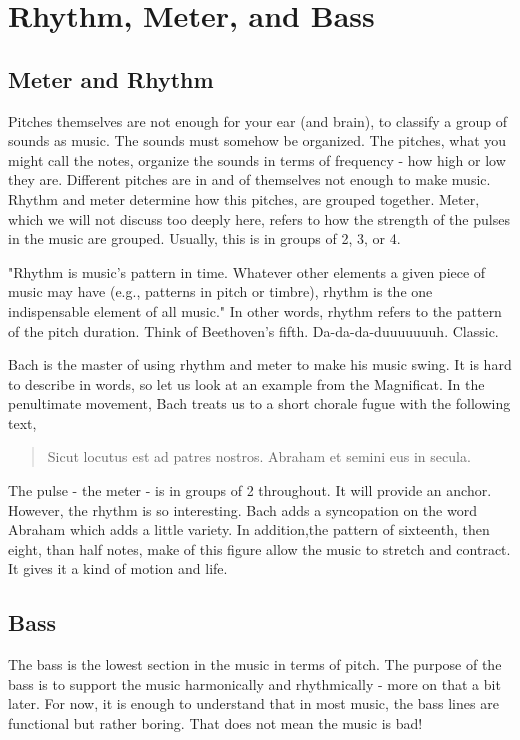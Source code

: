 \chapter{Rhythm, Meter, and Bass}

\section{Meter and Rhythm}
Pitches themselves are not enough for your ear (and brain), to classify a group of sounds as music. The sounds must somehow be organized. The pitches, what you might call the notes, organize the sounds in terms of frequency - how high or low they are. Different pitches are in and of themselves not enough to make music. Rhythm and meter determine how this pitches, are grouped together. Meter, which we will not discuss too deeply here, refers to how the strength of the pulses in the music are grouped. Usually, this is in groups of 2, 3, or 4. %

 "Rhythm is music's pattern in time. Whatever other elements a given piece of music may have (e.g., patterns in pitch or timbre), rhythm is the one indispensable element of all music." In other words, rhythm refers to the pattern of the pitch duration. Think of Beethoven's fifth. Da-da-da-duuuuuuuh. Classic.
 
 Bach is the master of using rhythm and meter to make his music swing. It is hard to describe in words, so let us look at an example from the Magnificat. In the penultimate movement, Bach treats us to a short chorale fugue with the following text, 
 \begin{verse}
 Sicut locutus est ad patres nostros. Abraham et semini eus in secula.
 \end{verse}

The pulse - the meter - is in groups of 2 throughout. It will provide an anchor. However, the rhythm is so interesting. Bach adds a syncopation on the word Abraham which adds a little variety. In addition,the pattern of sixteenth, then eight, than half notes, make of this figure allow the music to stretch and contract. It gives it a kind of motion and life.

\section{Bass}
The bass is the lowest section in the music in terms of pitch. The purpose of the bass is to support the music harmonically and rhythmically - more on that a bit later. For now, it is enough to understand that in most music, the bass lines are functional but rather boring. That does not mean the music is bad!

